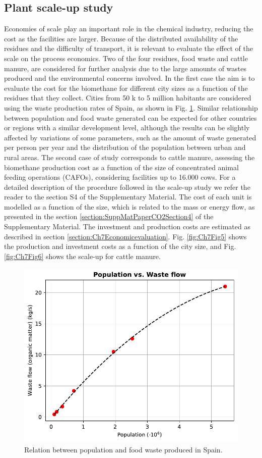 \begin{refsection}[referencesCh7]
\subsection{Plant scale-up study}
Economies of scale play an important role in the chemical industry, reducing the cost as the facilities are larger. Because of the distributed availability of the residues and the difficulty of transport, it is relevant to evaluate the effect of the scale on the process economics. Two of the four residues, food waste and cattle manure, are considered for further analysis due to the large amounts of wastes produced and the environmental concerns involved. In the first case the aim is to evaluate the cost for the biomethane for different city sizes as a function of the residues that they collect. Cities from 50 k to 5 million habitants are considered using the waste production rates of Spain, as shown in Fig. \ref{fig:Ch7Fig4}. Similar relationship between population and food waste generated can be expected for other countries or regions with a similar development level, although the results can be slightly affected by variations of some parameters, such as the amount of waste generated per person per year and the distribution of the population between urban and rural areas. The second case of study corresponds to cattle manure, assessing the biomethane production cost as a function of the size of concentrated animal feeding operations (CAFOs), considering facilities up to 16.000 cows. For a detailed description of the procedure followed in the scale-up study we refer the reader to the section S4 of the Supplementary Material. The cost of each unit is modelled as a function of the size, which is related to the mass or energy flow, as presented in the section \ref{section:SuppMatPaperCO2Section4} of the Supplementary Material. The investment and production costs are estimated as described in section \ref{section:Ch7Economicevaluation}. Fig. \ref{fig:Ch7Fig5} shows the production and investment costs as a function of the city size, and Fig. \ref{fig:Ch7Fig6} shows the scale-up for cattle manure.

\begin{figure}[h!]
	\centering
	\includegraphics[width=0.7\linewidth, trim={0cm 0cm 0cm 0cm},clip]{gfx/Chapter7/Figure4.pdf} 
	\caption{Relation between population and food waste produced in Spain.}
	\label{fig:Ch7Fig4}
\end{figure}


\end{refsection}
